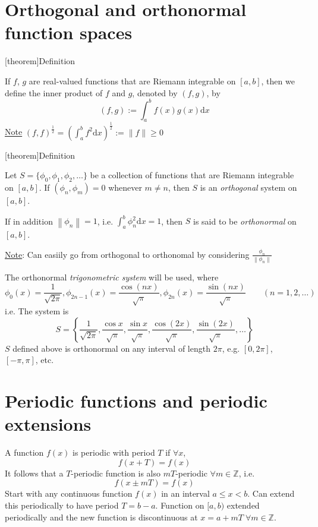 \documentclass[12pt]{report}
\theoremstyle{definition}
\begin{document}
\section{Orthogonal and orthonormal function spaces}
[theorem]{Definition}
\begin{inner product of f and g}
    If $f$, $g$ are real-valued functions that are Riemann integrable on $[a,b]$, 
    then we define the inner product of $f$ and $g$, denoted by $(f,g)$, by \[
        (f,g) := \int_{a}^{b} f(x)g(x) \mathrm{d}x
    \]\underline{Note} ${(f,f)}^{\frac{1}{2}} = {\left(\int_{a}^{b} f^{2} \mathrm{d}x\right)}^{\frac{1}{2}} 
    := \parallel f \parallel \ge 0$
\end{inner product of f and g}
[theorem]{Definition}
\begin{orthogonal system}
    Let $S = \{\phi_0, \phi_1, \phi_2, \ldots\}$ be a collection of functions that are Riemann integrable on $[a,b]$.
    If $(\phi_n, \phi_m) = 0$ whenever $m \neq n$, then $S$ is an \emph{orthogonal} system on $[a,b]$.
    
    If in addition $\left\|\phi_n\right\| = 1$, i.e. $\int_{a}^{b} \phi_n^{2} \mathrm{d}x = 1$,
    then $S$ is said to be \emph{orthonormal} on $[a,b]$.

    \underline{Note}: Can easiily go from orthogonal to orthonomal by considering $\frac{\phi_n}{\left\|\phi_n\right\| }$
\end{orthogonal system}
The orthonormal \emph{trigonometric system} will be used, where \[
    \phi_0(x) = \frac{1}{\sqrt{2\pi}}, \phi_{2n-1}(x) = \frac{\cos{(nx)}}{\sqrt{\pi}},
    \phi_{2n}(x) = \frac{\sin{(nx)}}{\sqrt{\pi}} \qquad (n = 1,2,\ldots)
\]i.e. The system is\[
S = \left\{\frac{1}{\sqrt{2\pi}}, \frac{\cos{x}}{\sqrt{\pi}}, \frac{\sin{x}}{\sqrt{\pi}},
\frac{\cos{(2x)}}{\sqrt{\pi}}, \frac{\sin{(2x)}}{\sqrt{\pi}}, \ldots\right\}
\]
$S$ defined above is orthonormal on any interval of length $2\pi$, e.g. $[0,2\pi]$, $[-\pi,\pi]$, etc.


\section{Periodic functions and periodic extensions}
A function $f(x)$ is periodic with period $T$ if $\forall x$,\[
    f(x + T) = f(x)
\]It follows that a $T$-periodic function is also $mT$-periodic $\forall m \in \mathbb{Z}$, i.e.\[
f(x \pm mT) = f(x)
\]
Start with any continuous function $f(x)$ in an interval $a \le x < b$. 
Can extend this periodically to have period $T = b - a$.
Function on $[a,b)$ extended periodically and the new function is discontinuous at %
$x = a + mT \;\forall m \in \mathbb{Z}$.
\end{document}
